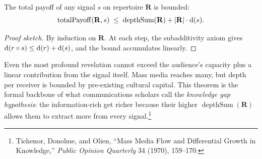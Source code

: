 \begin{theorem}
\label{thm:payoff-bound}
The total payoff of any signal $s$ on repertoire $\mathbf{R}$ is bounded:
\[
  \operatorname{totalPayoff}(\mathbf{R}, s)
  \;\le\; \operatorname{depthSum}(\mathbf{R}) + |\mathbf{R}| \cdot \operatorname{d}(s).
\]
\end{theorem}

\begin{proof}[Proof sketch]
By induction on $\mathbf{R}$.  At each step, the subadditivity axiom gives
$\operatorname{d}(r \circ s) \le \operatorname{d}(r) + \operatorname{d}(s)$, and the bound accumulates
linearly.
\end{proof}

Even the most profound revelation cannot exceed the audience's capacity plus a
linear contribution from the signal itself.  Mass media reaches many, but depth
per receiver is bounded by pre-existing cultural capital.  This theorem is the
formal backbone of what communications scholars call the
\emph{knowledge gap hypothesis}: the information-rich get richer because their
higher $\operatorname{depthSum}(\mathbf{R})$ allows them to extract more from
every signal.\footnote{Tichenor, Donohue, and Olien, ``Mass Media Flow and
Differential Growth in Knowledge,'' \textit{Public Opinion Quarterly}
34 (1970), 159--170.}

